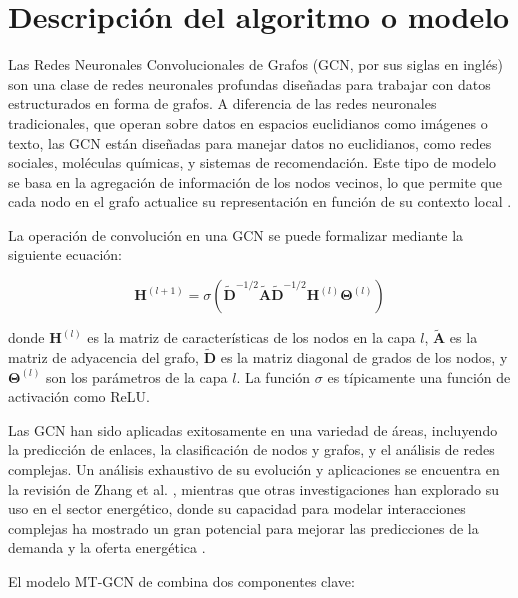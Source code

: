\documentclass[11pt]{article}
\begin{document}
\section{Descripción del algoritmo o modelo}

Las Redes Neuronales Convolucionales de Grafos (GCN, por sus siglas en inglés) son una clase de redes neuronales profundas diseñadas para trabajar con datos estructurados en forma de grafos. A diferencia de las redes neuronales tradicionales, que operan sobre datos en espacios euclidianos como imágenes o texto, las GCN están diseñadas para manejar datos no euclidianos, como redes sociales, moléculas químicas, y sistemas de recomendación. Este tipo de modelo se basa en la agregación de información de los nodos vecinos, lo que permite que cada nodo en el grafo actualice su representación en función de su contexto local \cite{zhang2019graph}.

La operación de convolución en una GCN se puede formalizar mediante la siguiente ecuación:

\[
\mathbf{H}^{(l+1)} = \sigma \left( \tilde{\mathbf{D}}^{-1/2} \tilde{\mathbf{A}} \tilde{\mathbf{D}}^{-1/2} \mathbf{H}^{(l)} \mathbf{\Theta}^{(l)} \right)
\]

donde \(\mathbf{H}^{(l)}\) es la matriz de características de los nodos en la capa \(l\), \(\tilde{\mathbf{A}}\) es la matriz de adyacencia del grafo, \(\tilde{\mathbf{D}}\) es la matriz diagonal de grados de los nodos, y \(\mathbf{\Theta}^{(l)}\) son los parámetros de la capa \(l\). La función \(\sigma\) es típicamente una función de activación como ReLU.

Las GCN han sido aplicadas exitosamente en una variedad de áreas, incluyendo la predicción de enlaces, la clasificación de nodos y grafos, y el análisis de redes complejas. Un análisis exhaustivo de su evolución y aplicaciones se encuentra en la revisión de Zhang et al. \cite{zhang2019graph}, mientras que otras investigaciones han explorado su uso en el sector energético, donde su capacidad para modelar interacciones complejas ha mostrado un gran potencial para mejorar las predicciones de la demanda y la oferta energética \cite{9339909}.

El modelo MT-GCN de \citet{9599348} combina dos componentes clave:
\end{document}
